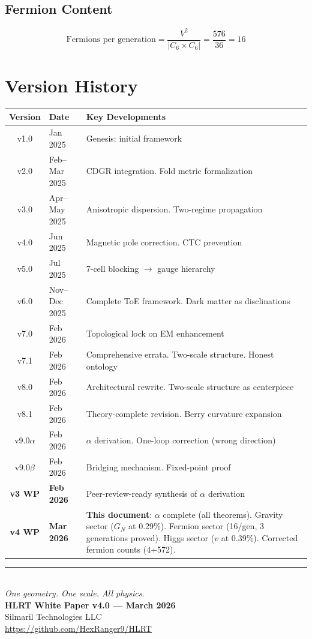 \documentclass[12pt,a4paper]{article}
\theoremstyle{plain}
\theoremstyle{definition}
\begin{document}
\subsection{Fermion Content}
\begin{equation}
\text{Fermions per generation} = \frac{V^2}{|C_6 \times C_6|} = \frac{576}{36} = 16
\end{equation}

\section{Version History}\label{app:versions}

\begin{table}[H]
\centering
\small
\begin{tabular}{clp{9cm}}
\toprule
\textbf{Version} & \textbf{Date} & \textbf{Key Developments} \\
\midrule
v1.0 & Jan 2025 & Genesis: initial framework \\
v2.0 & Feb--Mar 2025 & CDGR integration. Fold metric formalization \\
v3.0 & Apr--May 2025 & Anisotropic dispersion. Two-regime propagation \\
v4.0 & Jun 2025 & Magnetic pole correction. CTC prevention \\
v5.0 & Jul 2025 & 7-cell blocking $\to$ gauge hierarchy \\
v6.0 & Nov--Dec 2025 & Complete ToE framework. Dark matter as disclinations \\
v7.0 & Feb 2026 & Topological lock on EM enhancement \\
v7.1 & Feb 2026 & Comprehensive errata. Two-scale structure. Honest ontology \\
v8.0 & Feb 2026 & Architectural rewrite. Two-scale structure as centerpiece \\
v8.1 & Feb 2026 & Theory-complete revision. Berry curvature expansion \\
v9.0$\alpha$ & Feb 2026 & $\alpha$ derivation. One-loop correction (wrong direction) \\
v9.0$\beta$ & Feb 2026 & Bridging mechanism. Fixed-point proof \\
\textbf{v3 WP} & \textbf{Feb 2026} & Peer-review-ready synthesis of $\alpha$ derivation \\
\textbf{v4 WP} & \textbf{Mar 2026} & \textbf{This document}: $\alpha$ complete (all theorems). Gravity sector ($G_N$ at 0.29\%). Fermion sector (16/gen, 3 generations proved). Higgs sector ($v$ at 0.39\%). Corrected fermion counts (4+572). \\
\bottomrule
\end{tabular}
\end{table}

\vfill
\begin{center}
\rule{0.5\textwidth}{0.4pt}\\[1em]
\textit{One geometry. One scale. All physics.}\\[0.5em]
\textbf{HLRT White Paper v4.0 --- March 2026}\\
Silmaril Technologies LLC\\
\url{https://github.com/HexRanger9/HLRT}
\end{center}
\end{document}
